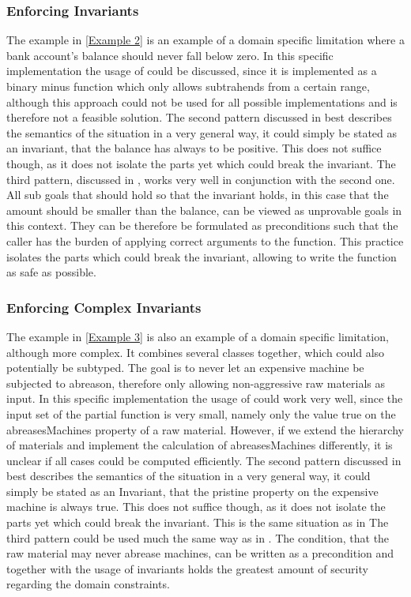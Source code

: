 \subsubsection{Enforcing Invariants} \label{Problem 2}
The example in \ref{Example 2} is an example of a domain specific limitation where a bank account's balance should never fall below zero. In this specific implementation the usage of  could be discussed, since it is implemented as a binary minus function which only allows subtrahends from a certain range, although this approach could not be used for all possible implementations and is therefore not a feasible solution. \newline
The second pattern discussed in  best describes the semantics of the situation in a very general way, it could simply be stated as an invariant, that the balance has always to be positive. This does not suffice though, as it does not isolate the parts yet which could break the invariant. \newline
The third pattern, discussed in , works very well in conjunction with the second one. All sub goals that should hold so that the invariant holds, in this case that the amount should be smaller than the balance, can be viewed as unprovable goals in this context. They can be therefore be formulated as preconditions such that the caller has the burden of applying correct arguments to the function. This practice isolates the parts which could break the invariant, allowing to write the function as safe as possible.
\subsubsection{Enforcing Complex Invariants}
The example in \ref{Example 3} is also an example of a domain specific limitation, although more complex. It combines several classes together, which could also potentially be subtyped. The goal is to never let an expensive machine be subjected to abreason, therefore only allowing non-aggressive raw materials as input. In this specific implementation the usage of  could work very well, since the input set of the partial function is very small, namely only the value true on the abreasesMachines property of a raw material. However, if we extend the hierarchy of materials and implement the calculation of abreasesMachines differently, it is unclear if all cases could be computed efficiently. \newline
The second pattern discussed in  best describes the semantics of the situation in a very general way, it could simply be stated as an Invariant, that the pristine property on the expensive machine is always true. This does not suffice though, as it does not isolate the parts yet which could break the invariant. This is the same situation as in  \newline
The third pattern could be used much the same way as in . The condition, that the raw material may never abrease machines, can be written as a precondition and together with the usage of invariants holds the greatest amount of security regarding the domain constraints.
